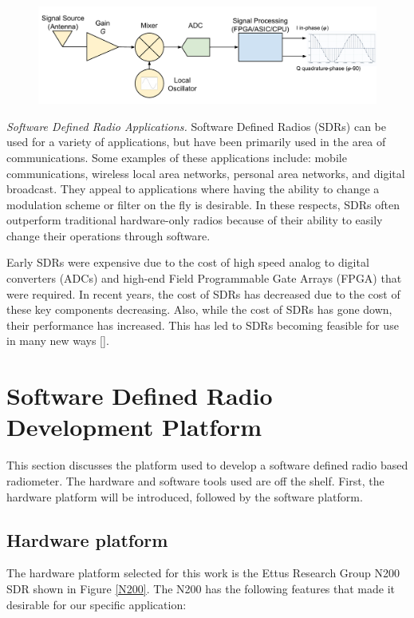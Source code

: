 {\begin{figure}[h!tb] 
\centering
\includegraphics[width=\textwidth]{Images/SDR_Prac_block.pdf}
\label{prac_sdr}
\end{figure}
}

\emph{Software Defined Radio Applications.}  Software Defined Radios (SDRs) can be used for a variety of applications, but have been primarily used in the area of communications.  Some examples of these applications include:  mobile communications, wireless local area networks, personal area networks, and digital broadcast.  They appeal to applications where having the ability to change a modulation scheme or filter on the fly is desirable.  In these respects, SDRs often outperform traditional hardware-only radios because of their ability to easily change their operations through software.  

Early SDRs were expensive due to the cost of high speed analog to digital converters (ADCs) and high-end Field Programmable Gate Arrays (FPGA) that were required.  In recent years, the cost of SDRs has decreased due to the cost of these key components decreasing.  Also, while the cost of SDRs has gone down, their performance has increased.  This has led to SDRs becoming feasible for use in many new ways [\cite{jondral2005software}].

\section{Software Defined Radio Development Platform} \label{SDR_platform}
This section discusses the platform used to develop a software defined radio based radiometer.  The hardware and software tools used are off the shelf.  First, the hardware platform will be introduced, followed by the software platform.  

\subsection{Hardware platform}\label{N200_HW}
The hardware platform selected for this work is the Ettus Research Group N200 SDR shown in Figure \ref{N200}.  The N200 has the following features that made it desirable for our specific application:

